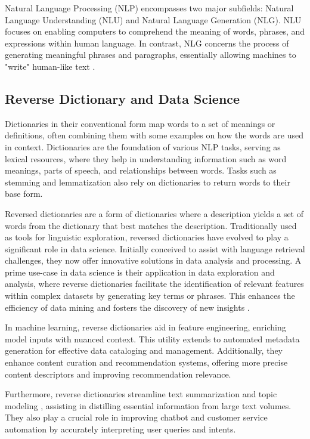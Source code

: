 \documentclass[15pt]{article}
\begin{document}
Natural Language Processing (NLP) encompasses two major subfields: Natural Language Understanding (NLU) and Natural Language Generation (NLG). NLU focuses on enabling computers to comprehend the meaning of words, phrases, and expressions within human language. In contrast, NLG concerns the process of generating meaningful phrases and paragraphs, essentially allowing machines to "write" human-like text \cite{Khurana2023}.

\subsection{Reverse Dictionary and Data Science}

Dictionaries in their conventional form map words to a set of meanings or definitions, often combining them with some examples on how the words are used in context. Dictionaries are the foundation of various NLP tasks, serving as lexical resources, where they help in understanding information such as word meanings, parts of speech, and relationships between words. Tasks such as stemming and lemmatization also rely on dictionaries to return words to their base form.

Reversed dictionaries are a form of dictionaries where a description yields a set of words from the dictionary that best matches the description. Traditionally used as tools for linguistic exploration, reversed dictionaries have evolved to play a significant role in data science. Initially conceived to assist with language retrieval challenges, they now offer innovative solutions in data analysis and processing. A prime use-case in data science is their application in data exploration and analysis, where reverse dictionaries facilitate the identification of relevant features within complex datasets by generating key terms or phrases. This enhances the efficiency of data mining and fosters the discovery of new insights \cite{Chen2022}.

In machine learning, reverse dictionaries aid in feature engineering, enriching model inputs with nuanced context. This utility extends to automated metadata generation for effective data cataloging and management. Additionally, they enhance content curation and recommendation systems, offering more precise content descriptors and improving recommendation relevance.

Furthermore, reverse dictionaries streamline text summarization and topic modeling \cite{Griffiths2004}, assisting in distilling essential information from large text volumes. They also play a crucial role in improving chatbot and customer service automation by accurately interpreting user queries and intents.
\end{document}
